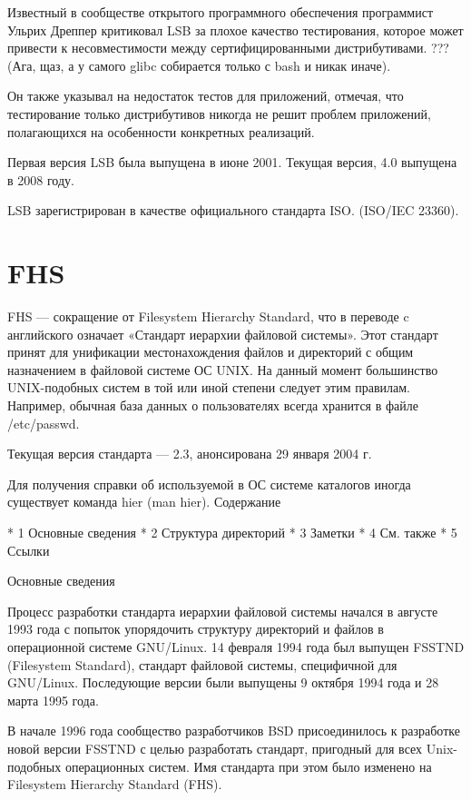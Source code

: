 Известный в сообществе открытого программного обеспечения программист Ульрих Дреппер критиковал LSB за плохое качество тестирования, которое может привести к несовместимости между сертифицированными дистрибутивами. ??? (Ага, щаз, а у самого glibc собирается только с bash и никак иначе).

Он также указывал на недостаток тестов для приложений, отмечая, что тестирование только дистрибутивов никогда не решит проблем приложений, полагающихся на особенности конкретных реализаций.

Первая версия LSB была выпущена в июне 2001. Текущая версия, 4.0 выпущена в 2008 году.

LSB зарегистрирован в качестве официального стандарта ISO. (ISO/IEC 23360).
\section {FHS}
FHS — сокращение от Filesystem Hierarchy Standard, что в переводе c английского означает «Стандарт иерархии файловой системы». Этот стандарт принят для унификации местонахождения файлов и директорий с общим назначением в файловой системе ОС UNIX. На данный момент большинство UNIX-подобных систем в той или иной степени следует этим правилам. Например, обычная база данных о пользователях всегда хранится в файле /etc/passwd.

Текущая версия стандарта — 2.3, анонсирована 29 января 2004 г.

Для получения справки об используемой в ОС системе каталогов иногда существует команда hier (man hier).
Содержание

    * 1 Основные сведения
    * 2 Структура директорий
    * 3 Заметки
    * 4 См. также
    * 5 Ссылки

Основные сведения

Процесс разработки стандарта иерархии файловой системы начался в августе 1993 года с попыток упорядочить структуру директорий и файлов в операционной системе GNU/Linux. 14 февраля 1994 года был выпущен FSSTND (Filesystem Standard), стандарт файловой системы, специфичной для GNU/Linux. Последующие версии были выпущены 9 октября 1994 года и 28 марта 1995 года.

В начале 1996 года сообщество разработчиков BSD присоединилось к разработке новой версии FSSTND с целью разработать стандарт, пригодный для всех Unix-подобных операционных систем. Имя стандарта при этом было изменено на Filesystem Hierarchy Standard (FHS).

